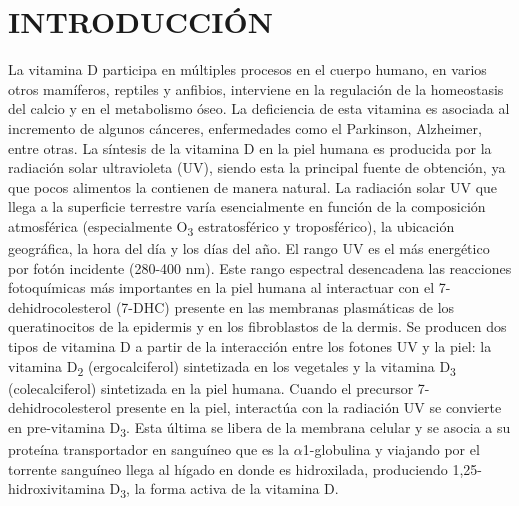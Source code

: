 \documentclass[10pt,twocolumn]{article}
\begin{document}
\section{INTRODUCCIÓN}
La vitamina D participa en múltiples procesos en el cuerpo humano, en varios otros mamíferos, reptiles y anfibios, interviene en la regulación de la homeostasis del calcio y en el metabolismo óseo. La deficiencia de esta vitamina es asociada al incremento de algunos cánceres, enfermedades como el Parkinson, Alzheimer, entre otras.\cite{Zittermann2011,Afzal2013,KRAVIETZ201750} La síntesis de la vitamina D en la piel humana es producida por la radiación solar ultravioleta (UV), siendo esta la principal fuente de obtención, ya que pocos alimentos la contienen de manera natural\cite{Biesalski_2002}. La radiación solar UV que llega a la superficie terrestre varía esencialmente en función de la composición atmosférica (especialmente O\textsubscript{3} estratosférico y troposférico), la ubicación geográfica, la hora del día y los días del año. El rango UV es el más energético por fotón incidente (280-400 nm). Este rango espectral desencadena las reacciones fotoquímicas más importantes en la piel humana al interactuar con el 7-dehidrocolesterol (7-DHC) presente en las membranas plasmáticas de los queratinocitos de la epidermis y en los fibroblastos de la dermis.\cite{2002,brunser_radiacion_2005,Olds2008} Se producen dos tipos de vitamina D a partir de la interacción entre los fotones UV y la piel: la vitamina D\textsubscript{2} (ergocalciferol) sintetizada en los vegetales y la vitamina D\textsubscript{3} (colecalciferol) sintetizada en la piel humana.\cite{Zhang2010} Cuando el precursor 7-dehidrocolesterol presente en la piel, interactúa con la radiación UV se convierte en pre-vitamina D\textsubscript{3}. Esta última se libera de la membrana celular y se asocia a su proteína transportador en sanguíneo que es la $\alpha$1-globulina y viajando por el torrente sanguíneo llega al hígado en donde es hidroxilada, produciendo 1,25-hidroxivitamina D\textsubscript{3}, la forma activa de la vitamina D.\cite{brunser_radiacion_2005}
\end{document}
